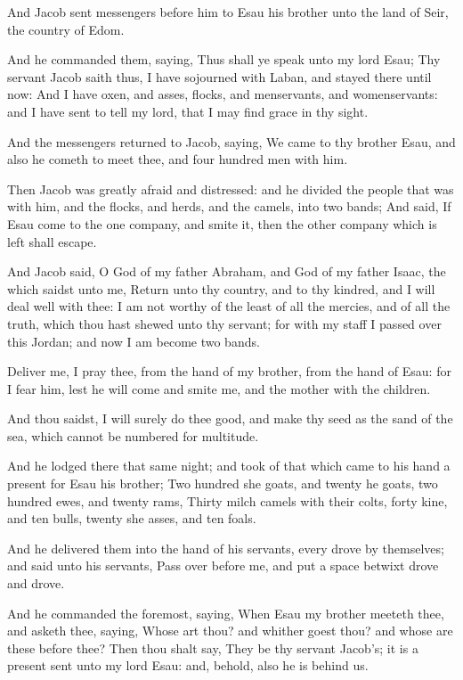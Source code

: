 \verse And Jacob sent messengers before him to Esau his brother unto the
land of Seir, the country of Edom.

\verse And he commanded them, saying, Thus shall ye speak unto my lord
Esau; Thy servant Jacob saith thus, I have sojourned with Laban, and
stayed there until now: \verse And I have oxen, and asses, flocks, and
menservants, and womenservants: and I have sent to tell my lord, that
I may find grace in thy sight.

\verse And the messengers returned to Jacob, saying, We came to thy
brother Esau, and also he cometh to meet thee, and four hundred men
with him.

\verse Then Jacob was greatly afraid and distressed: and he divided the
people that was with him, and the flocks, and herds, and the camels,
into two bands; \verse And said, If Esau come to the one company, and
smite it, then the other company which is left shall escape.

\verse And Jacob said, O God of my father Abraham, and God of my father
Isaac, the \LORD which saidst unto me, Return unto thy country, and to
thy kindred, and I will deal well with thee: \verse I am not worthy of
the least of all the mercies, and of all the truth, which thou hast
shewed unto thy servant; for with my staff I passed over this Jordan;
and now I am become two bands.

\verse Deliver me, I pray thee, from the hand of my brother, from the
hand of Esau: for I fear him, lest he will come and smite me, and the
mother with the children.

\verse And thou saidst, I will surely do thee good, and make thy seed
as the sand of the sea, which cannot be numbered for multitude.

\verse And he lodged there that same night; and took of that which came
to his hand a present for Esau his brother; \verse Two hundred she
goats, and twenty he goats, two hundred ewes, and twenty rams, \verse
Thirty milch camels with their colts, forty kine, and ten bulls,
twenty she asses, and ten foals.

\verse And he delivered them into the hand of his servants, every drove
by themselves; and said unto his servants, Pass over before me, and
put a space betwixt drove and drove.

\verse And he commanded the foremost, saying, When Esau my brother
meeteth thee, and asketh thee, saying, Whose art thou? and whither
goest thou? and whose are these before thee?  \verse Then thou shalt
say, They be thy servant Jacob's; it is a present sent unto my lord
Esau: and, behold, also he is behind us.

